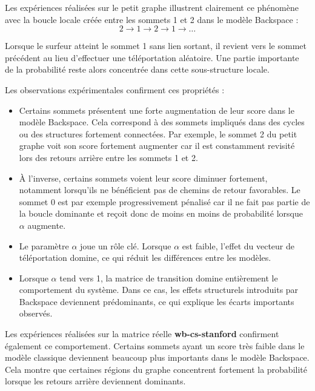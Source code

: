 \documentclass[a4paper,11pt]{article}
\begin{document}
Les expériences réalisées sur le petit graphe illustrent clairement ce phénomène avec la boucle locale créée entre les sommets 1 et 2 dans le modèle Backspace :
\[
2 \rightarrow 1 \rightarrow 2 \rightarrow 1 \rightarrow \dots
\]

Lorsque le surfeur atteint le sommet 1 sans lien sortant, il revient vers le sommet précédent au lieu d’effectuer une téléportation aléatoire. Une partie importante de la probabilité reste alors concentrée dans cette sous-structure locale.

Les observations expérimentales confirment ces propriétés :

\begin{itemize}
    \item Certains sommets présentent une forte augmentation de leur score dans le modèle Backspace. Cela correspond à des sommets impliqués dans des cycles ou des structures fortement connectées. Par exemple, le sommet 2 du petit graphe voit son score fortement augmenter car il est constamment revisité lors des retours arrière entre les sommets 1 et 2.
    
    \item À l’inverse, certains sommets voient leur score diminuer fortement, notamment lorsqu’ils ne bénéficient pas de chemins de retour favorables. Le sommet 0 est par exemple progressivement pénalisé car il ne fait pas partie de la boucle dominante et reçoit donc de moins en moins de probabilité lorsque $\alpha$ augmente.
    
    \item Le paramètre $\alpha$ joue un rôle clé. Lorsque $\alpha$ est faible, l’effet du vecteur de téléportation domine, ce qui réduit les différences entre les modèles.
    
    \item Lorsque $\alpha$ tend vers 1, la matrice de transition domine entièrement le comportement du système. Dans ce cas, les effets structurels introduits par Backspace deviennent prédominants, ce qui explique les écarts importants observés.
\end{itemize}

Les expériences réalisées sur la matrice réelle \textbf{wb-cs-stanford} confirment également ce comportement. Certains sommets ayant un score très faible dans le modèle classique deviennent beaucoup plus importants dans le modèle Backspace. Cela montre que certaines régions du graphe concentrent fortement la probabilité lorsque les retours arrière deviennent dominants.
\end{document}
